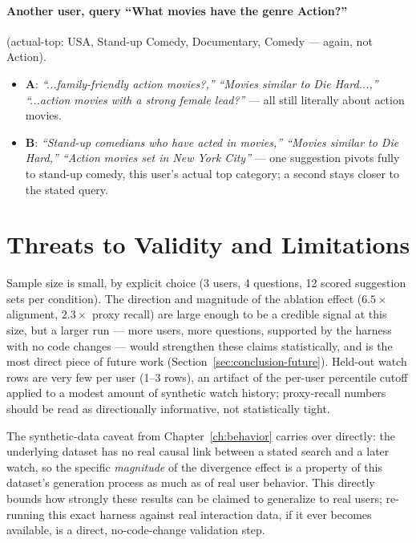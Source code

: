 \documentclass[11pt,a4paper,oneside]{book}
\begin{document}
\paragraph{Another user, query ``What movies have the genre Action?''} (actual-top: USA, Stand-up
Comedy, Documentary, Comedy --- again, not Action).
\begin{itemize}
    \item \textbf{A}: \emph{``...family-friendly action movies?,'' ``Movies similar to Die
        Hard...,'' ``...action movies with a strong female lead?''} --- all still literally about
        action movies.
    \item \textbf{B}: \emph{``Stand-up comedians who have acted in movies,'' ``Movies similar to
        Die Hard,'' ``Action movies set in New York City''} --- one suggestion pivots fully to
        stand-up comedy, this user's actual top category; a second stays closer to the stated query.
\end{itemize}

\section{Threats to Validity and Limitations}
\label{sec:eval-limits}

Sample size is small, by explicit choice (3 users, 4 questions, 12 scored suggestion sets per
condition). The direction and magnitude of the ablation effect ($6.5\times$ alignment, $2.3\times$
proxy recall) are large enough to be a credible signal at this size, but a larger run --- more
users, more questions, supported by the harness with no code changes --- would strengthen these
claims statistically, and is the most direct piece of future work
(Section~\ref{sec:conclusion-future}). Held-out watch rows are very few per user (1--3 rows), an
artifact of the per-user percentile cutoff applied to a modest amount of synthetic watch history;
proxy-recall numbers should be read as directionally informative, not statistically tight.

The synthetic-data caveat from Chapter~\ref{ch:behavior} carries over directly: the underlying
dataset has no real causal link between a stated search and a later watch, so the specific
\emph{magnitude} of the divergence effect is a property of this dataset's generation process as
much as of real user behavior. This directly bounds how strongly these results can be claimed to
generalize to real users; re-running this exact harness against real interaction data, if it ever
becomes available, is a direct, no-code-change validation step.
\end{document}
